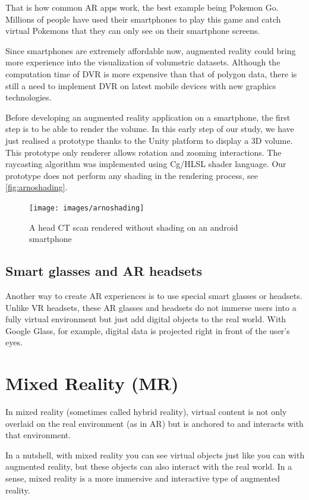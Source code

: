 That is how common AR apps work, the best example being Pokemon Go. Millions of people have used their smartphones to play this game and catch virtual Pokemons that they can only see on their smartphone screens. 


Since smartphones are extremely affordable now, augmented reality could bring more experience into the visualization of volumetric datasets. Although the computation time
of DVR is more expensive than that of polygon data, there is
still a need to implement DVR on latest mobile devices with
new graphics technologies.


Before developing an augmented reality application on a smartphone, the first step is to be able to render the volume. In this early step of our study, we have just realised a prototype thanks to the Unity platform to display a 3D volume. This prototype only renderer allows  rotation and zooming interactions. The raycasting algorithm was implemented using Cg/HLSL shader language. Our prototype does not  perform any shading in the rendering process, see \autoref{fig:arnoshading}. 

\begin{figure}
\centering
\texttt{[image: images/arnoshading]}
\caption{A head CT scan rendered without shading on an android smartphone }
\label{fig:arnoshading}
\end{figure}

\subsection{Smart glasses and AR headsets}

Another way to create AR experiences is to use special smart glasses or headsets. Unlike VR headsets, these AR glasses and headsets do not immerse users into a fully virtual environment but just add digital objects to the real world. With Google Glass, for example, digital data is projected right in front of the user's eyes.

\section{ Mixed Reality (MR)}

In mixed reality (sometimes called hybrid reality), virtual content is not only overlaid on the real environment (as in AR) but is anchored to and interacts with that environment.

In a nutshell, with mixed reality you can see virtual objects just like you can with augmented reality, but these objects can also interact with the real world. In a sense, mixed reality is a more immersive and interactive type of augmented reality.

